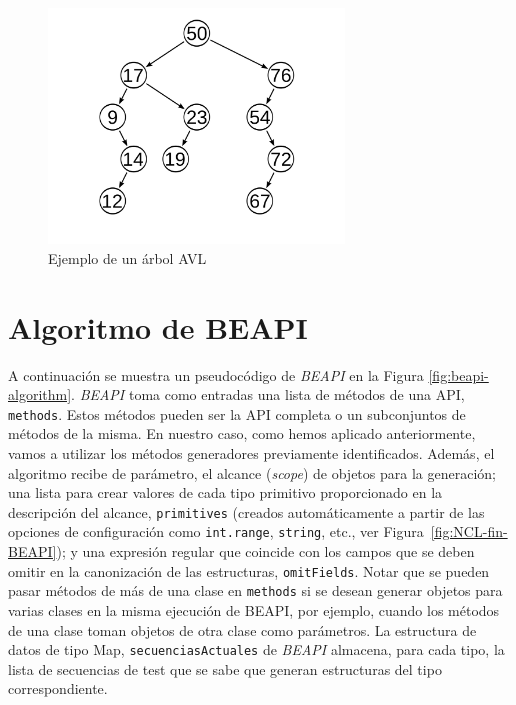 \begin{figure}
  \centering
  \includegraphics[width=0.7\textwidth]{images/avl.jpg}
  \caption{Ejemplo de un árbol AVL}
  \label{fig:avl}
\end{figure}

\section{Algoritmo de BEAPI}
\label{sec:beapiTechnique}

A continuación se muestra un pseudocódigo de \emph{BEAPI} en la Figura \ref{fig:beapi-algorithm}. 
\emph{BEAPI} toma como entradas una lista de métodos de una API,  \texttt{methods}. 
Estos métodos pueden ser la API completa o un subconjuntos de métodos de la misma. 
En nuestro caso, como hemos aplicado anteriormente, vamos a utilizar los métodos generadores previamente identificados. 
Además, el algoritmo recibe de parámetro, el alcance (\emph{scope}) de objetos para la generación; una lista para crear valores de cada tipo primitivo proporcionado en la descripción del alcance,
\texttt{primitives} (creados automáticamente a partir de las opciones de configuración como \texttt{int.range}, \texttt{string}, etc., ver Figura~\ref{fig:NCL-fin-BEAPI}); 
y una expresión regular que coincide con los campos que se deben omitir en la canonización de las estructuras, \texttt{omitFields}. 
Notar que se pueden pasar métodos de más de una clase en \texttt{methods} si se desean generar objetos para varias clases en la misma ejecución de \textsf{BEAPI},
por ejemplo, cuando los métodos de una clase toman objetos de otra clase como parámetros. 
La estructura de datos de tipo Map, \texttt{secuenciasActuales} de \emph{BEAPI}  almacena, para cada tipo, 
la lista de secuencias de test que se sabe que generan estructuras del tipo correspondiente. 

